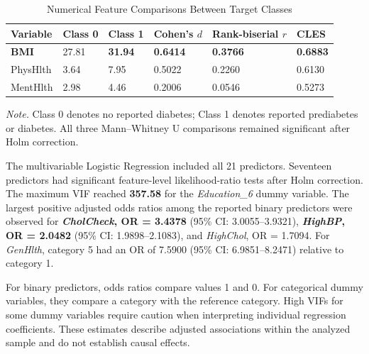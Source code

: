 \documentclass[pdflatex,sn-basic,Numbered]{sn-jnl}
\begin{document}
\begin{table}[htbp]
\centering
\caption{Numerical Feature Comparisons Between Target Classes}
\label{tab:numerical}
\footnotesize
\renewcommand{\arraystretch}{1.4}
\setlength{\tabcolsep}{5pt}

\begin{tabularx}{\linewidth}{lYYYYY}
\toprule
Variable &
Class 0 &
Class 1 &
Cohen's $d$ &
Rank-biserial $r$ &
CLES \\
\midrule

\textbf{BMI} &
27.81 &
\textbf{31.94} &
\textbf{0.6414} &
\textbf{0.3766} &
\textbf{0.6883} \\

PhysHlth &
3.64 &
7.95 &
0.5022 &
0.2260 &
0.6130 \\

MentHlth &
2.98 &
4.46 &
0.2006 &
0.0546 &
0.5273 \\

\bottomrule
\end{tabularx}

\vspace{1mm}

\begin{minipage}{\linewidth}
\scriptsize
\textit{Note.}
Class 0 denotes no reported diabetes; Class 1 denotes reported prediabetes
or diabetes. All three Mann--Whitney U comparisons remained significant
after Holm correction.
\end{minipage}
\end{table}

The multivariable Logistic Regression included all 21 predictors.
Seventeen predictors had significant feature-level likelihood-ratio tests
after Holm correction. The maximum VIF reached \textbf{357.58}
for the \textit{Education\_6} dummy variable.
The largest positive adjusted odds ratios among the reported binary predictors
were observed for
\textbf{\textit{CholCheck}, OR = 3.4378}
(95\% CI: 3.0055--3.9321),
\textbf{\textit{HighBP}, OR = 2.0482}
(95\% CI: 1.9898--2.1083),
and \textit{HighChol}, OR = 1.7094.
For \textit{GenHlth}, category 5 had an OR of 7.5900
(95\% CI: 6.9851--8.2471) relative to category 1.

For binary predictors, odds ratios compare values 1 and 0.
For categorical dummy variables, they compare a category with the
reference category. High VIFs for some dummy variables require caution
when interpreting individual regression coefficients.
These estimates describe adjusted associations within the analyzed sample
and do not establish causal effects.
\end{document}
